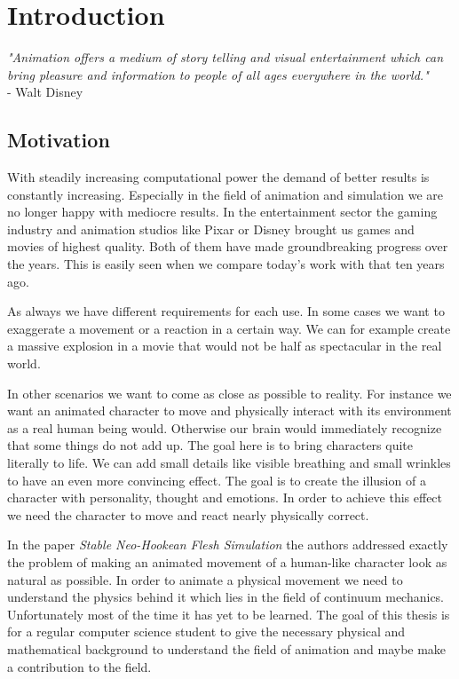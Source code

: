 \chapter{Introduction}
\textit{"Animation offers a medium of story telling and visual entertainment which can bring pleasure and information to people of all ages everywhere in the world."} \\
- Walt Disney


\section{Motivation}
With steadily increasing computational power the demand of better results is constantly increasing. Especially in the field of animation and simulation we are no longer happy with mediocre results. 
In the entertainment sector the gaming industry and animation studios like Pixar\textsuperscript{\textcopyright} or Disney\textsuperscript{\textcopyright} brought us games and movies of highest quality. Both of them have made groundbreaking progress over the years. This is easily seen when we compare today's work with that ten years ago. 

As always we have different requirements for each use.
In some cases we want to exaggerate a movement or a reaction in a certain way. We can for example create a massive explosion in a movie that would not be half as spectacular in the real world. 

In other scenarios we want to come as close as possible to reality. For instance we want an animated character to move and physically interact with its environment as a real human being would. Otherwise our brain would immediately recognize that some things do not add up.
The goal here is to bring characters quite literally to life. We can add small details like visible breathing and small wrinkles to have an even more convincing effect. The goal is to create the illusion of a character with personality, thought and emotions. In order to achieve this effect we need the character to move and react nearly physically correct. 

In the paper \textit{Stable Neo-Hookean Flesh Simulation} \cite{Smith:2018:SNF:3191713.3180491} the authors addressed exactly the problem of making an animated movement of a human-like character look as natural as possible. In order to animate a physical movement we need to understand the physics behind it which lies in the field of continuum mechanics. Unfortunately most of the time it has yet to be learned. The goal of this thesis is for a regular computer science student to give the necessary physical and mathematical background to understand the field of animation and maybe make a contribution to the field.



